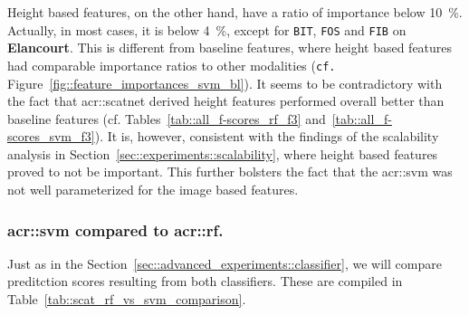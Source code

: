             Height based features, on the other hand, have a ratio of importance below \SI{10}{\percent}.
            Actually, in most cases, it is below \SI{4}{\percent}, except for \texttt{BIT}, \texttt{FOS} and \texttt{FIB} on \textbf{Elancourt}.
            This is different from baseline features, where height based features had comparable importance ratios to other modalities (\texttt{cf.} Figure~\ref{fig::feature_importances_svm_bl}).
            It seems to be contradictory with the fact that \gls{acr::scatnet} derived height features performed overall better than baseline features (cf. Tables~\ref{tab::all_f-scores_rf_f3} and~\ref{tab::all_f-scores_svm_f3}).
            It is, however, consistent with the findings of the scalability analysis in Section~\ref{sec::experiments::scalability}, where height based features proved to not be important.
            This further bolsters the fact that the \gls{acr::svm} was not well parameterized for the image based features.\\

        \subsubsection{\texorpdfstring{\acrshort*{acr::svm}}{SVM} compared to \texorpdfstring{\acrshort*{acr::rf}}{RF}.}
            \label{subsubsec::advanced_experiments::better_features::scatnet_baseline::svm_rf}
            Just as in the Section~\ref{sec::advanced_experiments::classifier}, we will compare preditction scores resulting from both classifiers.
            These are compiled in Table~\ref{tab::scat_rf_vs_svm_comparison}.

